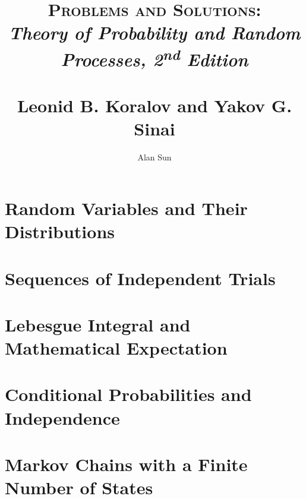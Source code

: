 \documentclass{report}
\title{\textsc{Problems and Solutions:} \\ 
\textit{Theory of Probability and Random Processes, 2\textsuperscript{nd} Edition} \\ 
~\\ \large Leonid B. Koralov and Yakov G. Sinai}
\author{Alan Sun}
\date{}
\begin{document}
\maketitle

\tableofcontents

\chapter{Random Variables and Their Distributions}

\chapter{Sequences of Independent Trials}

\chapter{Lebesgue Integral and Mathematical Expectation}

\chapter{Conditional Probabilities and Independence}


\chapter{Markov Chains with a Finite Number of States}

\end{document}
